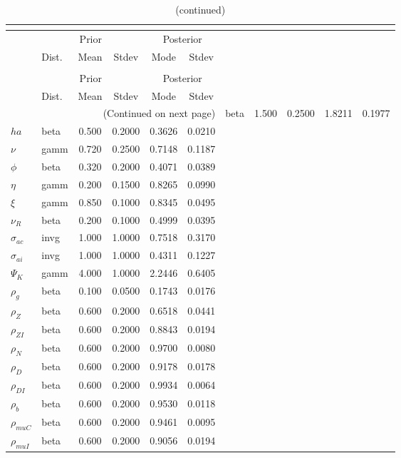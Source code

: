  
\begin{center}
\begin{longtable}{llcccc} 
\caption{Results from posterior maximization (parameters)}\\
 \label{Table:Posterior:1}\\
\toprule 
  & \multicolumn{3}{c}{Prior}  &  \multicolumn{2}{c}{Posterior} \\
  \cmidrule(r{.75em}){2-4} \cmidrule(r{.75em}){5-6}
  & Dist. & Mean  & Stdev & Mode & Stdev \\ 
\midrule \endfirsthead 
\caption{(continued)}\\
 \bottomrule 
  & \multicolumn{3}{c}{Prior}  &  \multicolumn{2}{c}{Posterior} \\
  \cmidrule(r{.75em}){2-4} \cmidrule(r{.75em}){5-6}
  & Dist. & Mean  & Stdev & Mode & Stdev \\ 
\midrule \endhead 
\bottomrule \multicolumn{6}{r}{(Continued on next page)}\endfoot 
\bottomrule\endlastfoot 
${\sigma}$ & beta &   1.500 & 0.2500 &   1.8211 &  0.1977 \\ 
${ha}$ & beta &   0.500 & 0.2000 &   0.3626 &  0.0210 \\ 
$\nu$ & gamm &   0.720 & 0.2500 &   0.7148 &  0.1187 \\ 
${\phi}$ & beta &   0.320 & 0.2000 &   0.4071 &  0.0389 \\ 
${\eta}$ & gamm &   0.200 & 0.1500 &   0.8265 &  0.0990 \\ 
$\xi$ & gamm &   0.850 & 0.1000 &   0.8345 &  0.0495 \\ 
${\nu_R}$ & beta &   0.200 & 0.1000 &   0.4999 &  0.0395 \\ 
${\sigma_{ac}}$ & invg &   1.000 & 1.0000 &   0.7518 &  0.3170 \\ 
${\sigma_{ai}}$ & invg &   1.000 & 1.0000 &   0.4311 &  0.1227 \\ 
${\Psi_{K}}$ & gamm &   4.000 & 1.0000 &   2.2446 &  0.6405 \\ 
${\rho_g}$ & beta &   0.100 & 0.0500 &   0.1743 &  0.0176 \\ 
${\rho_Z}$ & beta &   0.600 & 0.2000 &   0.6518 &  0.0441 \\ 
${\rho_{ZI}}$ & beta &   0.600 & 0.2000 &   0.8843 &  0.0194 \\ 
${\rho_N}$ & beta &   0.600 & 0.2000 &   0.9700 &  0.0080 \\ 
${\rho_D}$ & beta &   0.600 & 0.2000 &   0.9178 &  0.0178 \\ 
${\rho_{DI}}$ & beta &   0.600 & 0.2000 &   0.9934 &  0.0064 \\ 
${\rho_b}$ & beta &   0.600 & 0.2000 &   0.9530 &  0.0118 \\ 
${\rho_{muC}}$ & beta &   0.600 & 0.2000 &   0.9461 &  0.0095 \\ 
${\rho_{muI}}$ & beta &   0.600 & 0.2000 &   0.9056 &  0.0194 \\ 
\end{longtable}
 \end{center}

